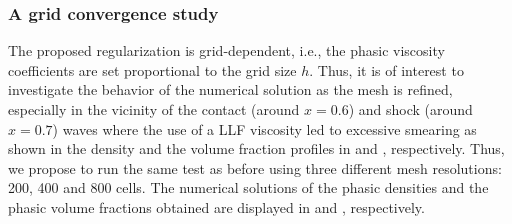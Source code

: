 \subsubsection{A grid convergence study}\label{sec:grid-conv-study}
The proposed regularization is grid-dependent, i.e., the phasic viscosity coefficients are set proportional to the grid size $h$. Thus, it is of interest to investigate the behavior of the numerical solution as the mesh is refined, especially in the
vicinity of the contact (around $x=0.6$) and shock (around $x=0.7$) waves where the use of a LLF viscosity led to excessive smearing as shown in the density and the volume fraction profiles in  and 
, respectively. Thus, we propose to run the same test as before using three different mesh resolutions:
 200, 400 and 800 cells. The numerical solutions of the phasic densities and the phasic volume fractions obtained are displayed
in  and , respectively.
%

